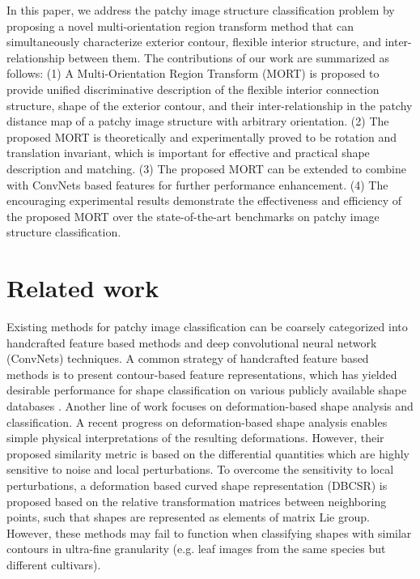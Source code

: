\documentclass[letterpaper]{article} %
\begin{document}
In this paper, we address the patchy image structure classification problem by proposing a novel multi-orientation region transform method that can simultaneously characterize exterior contour, flexible interior structure, and inter-relationship between them. The contributions of our work are summarized as follows: (1) A Multi-Orientation Region Transform (MORT) is proposed to provide unified discriminative description of the flexible interior connection structure, shape of the exterior contour, and their inter-relationship in the patchy distance map of a patchy image structure with arbitrary orientation. (2) The proposed MORT is theoretically and experimentally proved to be rotation and translation invariant, which is important for effective and practical shape description and matching. (3) The proposed MORT can be extended to combine with ConvNets based features for further performance enhancement. (4) The encouraging experimental results demonstrate the effectiveness and efficiency of the proposed MORT over the state-of-the-art benchmarks on patchy image structure classification.









\section{Related work}
Existing methods for patchy image classification can be coarsely categorized into handcrafted feature based methods and deep convolutional neural network (ConvNets) techniques. A common strategy of handcrafted feature based methods is to present contour-based feature representations, which has yielded desirable performance for shape classification on various publicly available shape databases \cite{7,11,25,28}. Another line of work focuses on deformation-based shape analysis and classification. A recent progress on deformation-based shape analysis \cite{20} enables simple physical interpretations of the resulting deformations. However, their proposed similarity metric is based on the differential quantities which are highly sensitive to noise and local perturbations. To overcome the sensitivity to local perturbations, a deformation based curved shape representation (DBCSR) \cite{4} is proposed based on the relative transformation matrices between neighboring points, such that shapes are represented as elements of matrix Lie group. However, these methods may fail to function when classifying shapes with similar contours in ultra-fine granularity (e.g. leaf images from the same species but different cultivars). 
\end{document}
